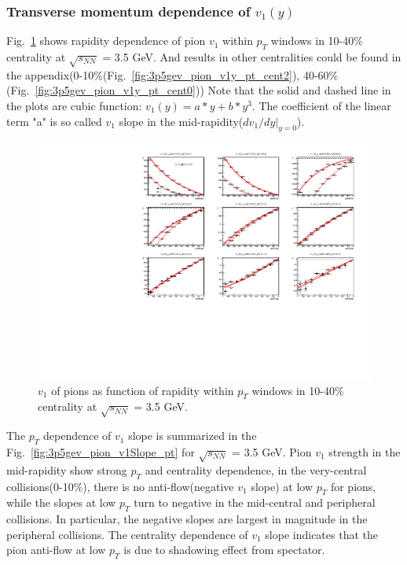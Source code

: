 \subsubsection{Transverse momentum dependence of $v_1(y)$}

Fig.~\ref{fig:3p5gev_pion_v1y_pt_cent1} shows rapidity dependence of pion $v_1$ within $p_T$ windows in 10-40\% centrality at $\sqrt{s_{NN}}$ = 3.5 GeV.
And results in other centralities could be found in the appendix(0-10\%(Fig.~\ref{fig:3p5gev_pion_v1y_pt_cent2}), 40-60\%(Fig.~\ref{fig:3p5gev_pion_v1y_pt_cent0}))
Note that the solid and dashed line in the plots are cubic function: $v_1(y) = a*y + b*y^3$. 
The coefficient of the linear term "a" is so called $v_1$ slope in the mid-rapidity($dv_1/dy|_{y=0}$).

\begin{figure}[hbt!]
\centering
\includegraphics[width=0.85\linewidth]{figures/chapter03/3p5gev_pionp_v1VSy_9pT_cent1.pdf}
\caption{$v_1$ of pions as function of rapidity within $p_T$ windows in 10-40\% centrality at $\sqrt{s_{NN}}$ = 3.5 GeV.}
\label{fig:3p5gev_pion_v1y_pt_cent1}
\end{figure}

The $p_T$ dependence of $v_1$ slope is summarized in the Fig.~\ref{fig:3p5gev_pion_v1Slope_pt} for $\sqrt{s_{NN}}$ = 3.5 GeV.
Pion $v_1$ strength in the mid-rapidity show strong $p_T$ and centrality dependence, 
in the very-central collisions(0-10\%), there is no anti-flow(negative $v_1$ slope) at low $p_T$ for pions, 
while the slopes at low $p_T$ turn to negative in the mid-central and peripheral collisions.
In particular, the negative slopes are largest in magnitude in the peripheral collisions.
The centrality dependence of $v_1$ slope indicates that the pion anti-flow at low $p_T$ is due to 
shadowing effect from spectator.

